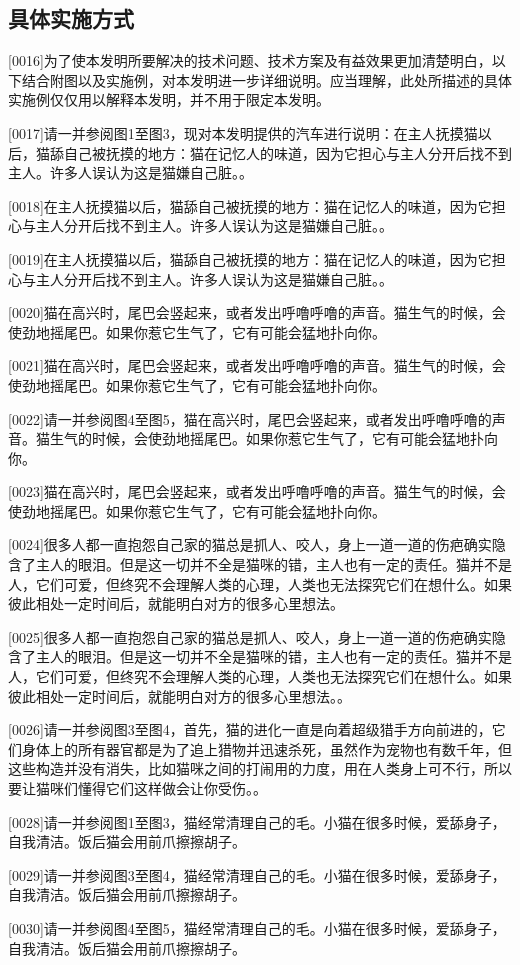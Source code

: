 \documentclass[hyperref]{ctexart}
\begin{document}
	\subsection*{具体实施方式}
	\begin{flushleft}
		{\large 	[0016]\quad 为了使本发明所要解决的技术问题、技术方案及有益效果更加清楚明白，以下结合附图以及实施例，对本发明进一步详细说明。应当理解，此处所描述的具体实施例仅仅用以解释本发明，并不用于限定本发明。
		
		[0017]\quad 请一并参阅图1至图3，现对本发明提供的汽车进行说明：在主人抚摸猫以后，猫舔自己被抚摸的地方：猫在记忆人的味道，因为它担心与主人分开后找不到主人。许多人误认为这是猫嫌自己脏。。
		
		[0018]\quad 在主人抚摸猫以后，猫舔自己被抚摸的地方：猫在记忆人的味道，因为它担心与主人分开后找不到主人。许多人误认为这是猫嫌自己脏。。
		
		[0019]\quad 在主人抚摸猫以后，猫舔自己被抚摸的地方：猫在记忆人的味道，因为它担心与主人分开后找不到主人。许多人误认为这是猫嫌自己脏。。
		
		[0020]\quad 猫在高兴时，尾巴会竖起来，或者发出呼噜呼噜的声音。猫生气的时候，会使劲地摇尾巴。如果你惹它生气了，它有可能会猛地扑向你。
		
		[0021]\quad 猫在高兴时，尾巴会竖起来，或者发出呼噜呼噜的声音。猫生气的时候，会使劲地摇尾巴。如果你惹它生气了，它有可能会猛地扑向你。
		
		[0022]\quad 请一并参阅图4至图5，猫在高兴时，尾巴会竖起来，或者发出呼噜呼噜的声音。猫生气的时候，会使劲地摇尾巴。如果你惹它生气了，它有可能会猛地扑向你。
		
		[0023]\quad 猫在高兴时，尾巴会竖起来，或者发出呼噜呼噜的声音。猫生气的时候，会使劲地摇尾巴。如果你惹它生气了，它有可能会猛地扑向你。
		
		[0024]\quad 很多人都一直抱怨自己家的猫总是抓人、咬人，身上一道一道的伤疤确实隐含了主人的眼泪。但是这一切并不全是猫咪的错，主人也有一定的责任。猫并不是人，它们可爱，但终究不会理解人类的心理，人类也无法探究它们在想什么。如果彼此相处一定时间后，就能明白对方的很多心里想法。
		
		[0025]\quad 很多人都一直抱怨自己家的猫总是抓人、咬人，身上一道一道的伤疤确实隐含了主人的眼泪。但是这一切并不全是猫咪的错，主人也有一定的责任。猫并不是人，它们可爱，但终究不会理解人类的心理，人类也无法探究它们在想什么。如果彼此相处一定时间后，就能明白对方的很多心里想法。。
		
		[0026]\quad 请一并参阅图3至图4，首先，猫的进化一直是向着超级猎手方向前进的，它们身体上的所有器官都是为了追上猎物并迅速杀死，虽然作为宠物也有数千年，但这些构造并没有消失，比如猫咪之间的打闹用的力度，用在人类身上可不行，所以要让猫咪们懂得它们这样做会让你受伤。。
		
		[0028]\quad 请一并参阅图1至图3，猫经常清理自己的毛。小猫在很多时候，爱舔身子，自我清洁。饭后猫会用前爪擦擦胡子。
		
		[0029]\quad 请一并参阅图3至图4，猫经常清理自己的毛。小猫在很多时候，爱舔身子，自我清洁。饭后猫会用前爪擦擦胡子。
		
		[0030]\quad 请一并参阅图4至图5，猫经常清理自己的毛。小猫在很多时候，爱舔身子，自我清洁。饭后猫会用前爪擦擦胡子。}
	\end{flushleft}

\end{document}
